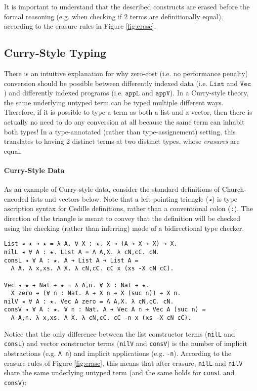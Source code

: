 \documentclass[acmsmall]{acmart}\settopmatter{}
\newcommand{\labsec}[1]{\label{sec:#1}}
\newcommand{\reffig}[1]{Figure \ref{fig:#1}}
\newcommand{\txt}[1]{\ensuremath{\texttt{#1}}}
\begin{document}
It is important to understand that the described constructs are erased
before the formal reasoning (e.g. when checking if 2 terms are
definitionally equal), according to the erasure rules in
\reffig{erase}.

\subsection{Curry-Style Typing}
\labsec{back:curry}

There is an intuitive explanation for why zero-cost (i.e. no
performance penalty) conversion should be possible
between differently indexed data (i.e. \txt{List} and \txt{Vec}) and
differently indexed programs (i.e. \txt{appL} and
\txt{appV}). In a Curry-style theory, the same
underlying untyped term can be typed multiple different
ways. Therefore, if it is possible to type a term as both a list and a
vector, then there is actually no need to do any conversion at all
because the same term can inhabit both types! In a type-annotated
(rather than type-assignement) setting, this translates to having 2
distinct terms at two distinct types, whose \textit{erasures} are equal.

\paragraph{Curry-Style Data}
As an example of Curry-style data, consider the standard definitions
of Church-encoded lists and vectors below. Note that a left-pointing
triangle (\verb;◂;) is type ascription syntax for Cedille definitions,
rather than a conventional colon (\verb;:;). The direction of the
triangle is meant to convey that the definition will be checked using
the checking (rather than inferring) mode of a bidirectional type
checker.
\begin{verbatim}
List ◂ ★ ➔ ★ = λ A. ∀ X : ★. X ➔ (A ➔ X ➔ X) ➔ X.
nilL ◂ ∀ A : ★. List A = Λ A,X. λ cN,cC. cN.
consL ◂ ∀ A : ★. A ➔ List A ➔ List A =
  Λ A. λ x,xs. Λ X. λ cN,cC. cC x (xs -X cN cC).

Vec ◂ ★ ➔ Nat ➔ ★ = λ A,n. ∀ X : Nat ➔ ★.
  X zero ➔ (∀ n : Nat. A ➔ X n ➔ X (suc n)) ➔ X n.
nilV ◂ ∀ A : ★. Vec A zero = Λ A,X. λ cN,cC. cN.
consV ◂ ∀ A : ★. ∀ n : Nat. A ➔ Vec A n ➔ Vec A (suc n) =
  Λ A,n. λ x,xs. Λ X. λ cN,cC. cC -n x (xs -X cN cC).
\end{verbatim}
Notice that the only difference between the list constructor terms
(\verb;nilL; and \verb;consL;) and vector constructor terms
(\verb;nilV; and \verb;consV;) is the number of implicit
abstractions (e.g. \verb;Λ n;) and implicit applications
(e.g. \verb;-n;). According to the erasure rules of \reffig{erase},
this means that after erasure, \verb;nilL; and \verb;nilV; share the
same underlying untyped term
(and the same holds for \verb;consL; and \verb;consV;):
\end{document}
